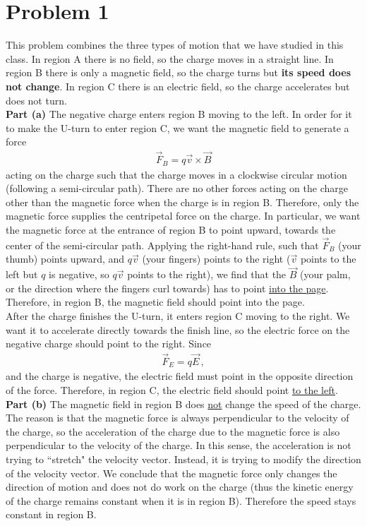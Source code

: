 \documentclass[11pt]{article}
\begin{document}
\newpage
\section*{Problem 1}
This problem combines the three types of motion that we have studied in this class. In region A there is no field, so the charge moves in a straight line. In region B there is only a magnetic field, so the charge turns but \textbf{its speed does not change}. In region C there is an electric field, so the charge accelerates but does not turn.\\

\noindent\textbf{Part (a)} The negative charge enters region B moving to the left. In order for it to make the U-turn to enter region C, we want the magnetic field to generate a force 
\begin{align*}
\vec{F}_B = q\vec{v}\times \vec{B}
\end{align*}
acting on the charge such that the charge moves in a clockwise circular motion (following a semi-circular path). There are no other forces acting on the charge other than the magnetic force when the charge is in region B. Therefore, only the magnetic force supplies the centripetal force on the charge. In particular, we want the magnetic force at the entrance of region B to point upward, towards the center of the semi-circular path. Applying the right-hand rule, such that $\vec{F}_B$ (your thumb) points upward, and $q\vec{v}$ (your fingers) points to the right ($\vec{v}$ points to the left but $q$ is negative, so $q\vec{v}$ points to the right), we find that the $\vec{B}$ (your palm, or the direction where the fingers curl towards) has to point \underline{into the page}. Therefore, in region B, the magnetic field should point into the page.\\

After the charge finishes the U-turn, it enters region C moving to the right. We want it to accelerate directly towards the finish line, so the electric force on the negative charge should point to the right. Since
\begin{align*}
\vec{F}_E = q\vec{E}\,,
\end{align*}
and the charge is negative, the electric field must point in the opposite direction of the force. Therefore, in region C, the electric field should point \underline{to the left}.\\

\noindent\textbf{Part (b)} The magnetic field in region B does \underline{not} change the speed of the charge. The reason is that the magnetic force is always perpendicular to the velocity of the charge, so the acceleration of the charge due to the magnetic force is also perpendicular to the velocity of the charge. In this sense, the acceleration is not trying to ``stretch" the velocity vector. Instead, it is trying to modify the direction of the velocity vector. We conclude that the magnetic force only changes the direction of motion and does not do work on the charge (thus the kinetic energy of the charge remains constant when it is in region B). Therefore the speed stays constant in region B.\\
\end{document}
